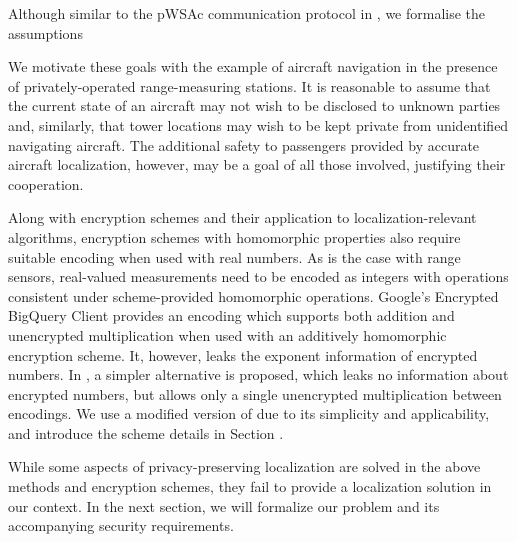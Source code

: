 \documentclass[10pt,letterpaper,oneside,twocolumn,journal]{IEEEtran}
\theoremstyle{definition}
\theoremstyle{definition}
\theoremstyle{remark}
\begin{document}
Although similar to the pWSAc communication protocol in \cite{alexandruPrivateWeightedSum2020}, we formalise the assumptions 

We motivate these goals with the example of aircraft navigation in the presence of privately-operated range-measuring stations. It is reasonable to assume that the current state of an aircraft may not wish to be disclosed to unknown parties and, similarly, that tower locations may wish to be kept private from unidentified navigating aircraft. The additional safety to passengers provided by accurate aircraft localization, however, may be a goal of all those involved, justifying their cooperation.

Along with encryption schemes and their application to localization-relevant algorithms, encryption schemes with homomorphic properties also require suitable encoding when used with real numbers. As is the case with range sensors, real-valued measurements need to be encoded as integers with operations consistent under scheme-provided homomorphic operations. Google's Encrypted BigQuery Client \cite{googleEncryptedbigqueryclient2015} provides an encoding which supports both addition and unencrypted multiplication when used with an additively homomorphic encryption scheme. It, however, leaks the exponent information of encrypted numbers. In \cite{farokhiSecurePrivateControl2017}, a simpler alternative is proposed, which leaks no information about encrypted numbers, but allows only a single unencrypted multiplication between encodings. We use a modified version of \cite{farokhiSecurePrivateControl2017} due to its simplicity and applicability, and introduce the scheme details in Section .

While some aspects of privacy-preserving localization are solved in the above methods and encryption schemes, they fail to provide a localization solution in our context. In the next section, we will formalize our problem and its accompanying security requirements.

% 
% 
\end{document}
